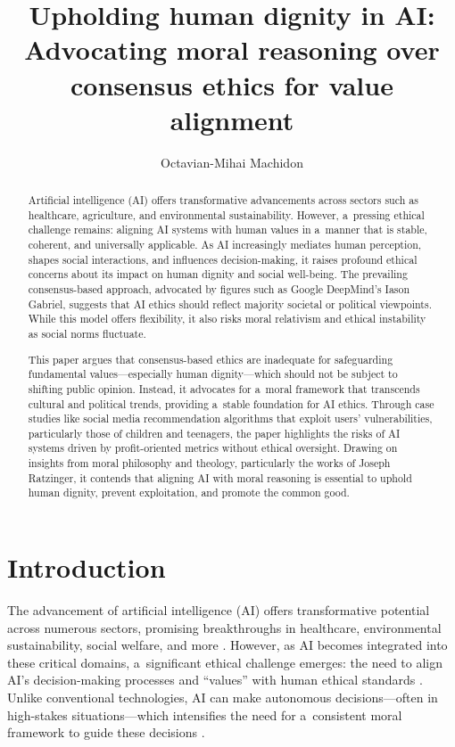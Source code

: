 \documentclass[%
  manuscript=article,
  year=2024,
  volume=77,
  doi=10.59203/zfn.77.707,
]{zfn}
\title[Upholding human dignity in AI\ldots]{Upholding human dignity in AI: Advocating moral reasoning over consensus ethics for value alignment}
\author{Octavian-Mihai Machidon}
\affiliation{University of Ljubljana}
\begin{document}
\begin{abstract}
Artificial intelligence (AI) offers transformative advancements across sectors such as healthcare, agriculture, and environmental sustainability. However, a~pressing ethical challenge remains: aligning AI systems with human values in a~manner that is stable, coherent, and universally applicable. As AI increasingly mediates human perception, shapes social interactions, and influences decision-making, it raises profound ethical concerns about its impact on human dignity and social well-being. The prevailing consensus-based approach, advocated by figures such as Google DeepMind's Iason Gabriel, suggests that AI ethics should reflect majority societal or political viewpoints. While this model offers flexibility, it also risks moral relativism and ethical instability as social norms fluctuate.

This paper argues that consensus-based ethics are inadequate for safeguarding fundamental values---especially human dignity---which should not be subject to shifting public opinion. Instead, it advocates for a~moral framework that transcends cultural and political trends, providing a~stable foundation for AI ethics. Through case studies like social media recommendation algorithms that exploit users' vulnerabilities, particularly those of children and teenagers, the paper highlights the risks of AI systems driven by profit-oriented metrics without ethical oversight. Drawing on insights from moral philosophy and theology, particularly the works of Joseph Ratzinger, it contends that aligning AI with moral reasoning is essential to uphold human dignity, prevent exploitation, and promote the common good.
\end{abstract}







\section{Introduction}

The advancement of artificial intelligence (AI) offers transformative potential across numerous sectors, promising breakthroughs in healthcare, environmental sustainability, social welfare, and more 
\parencites[][]{vinuesa_role_2020}[][]{topol_deep_2019}. %
 However, as AI becomes integrated into these critical domains, a~significant ethical challenge emerges: the need to align AI's decision-making processes and ``values'' with human ethical standards 
\parencite[][]{unesco_recommendation_2021}. %
 Unlike conventional technologies, AI can make autonomous decisions---often in high-stakes situations---which intensifies the need for a~consistent moral framework to guide these decisions 
\parencite[][]{floridi_unified_2019}.%
\end{document}
